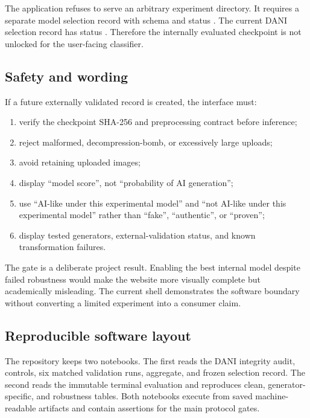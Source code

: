 \documentclass[12pt,a4paper]{article}
\begin{document}
The application refuses to serve an arbitrary experiment directory. It requires a separate model
selection record with schema  and status
. The current DANI selection record has status
. Therefore the internally evaluated
checkpoint is not unlocked for the user-facing classifier.

\subsection{Safety and wording}

If a future externally validated record is created, the interface must:

\begin{enumerate}
  \item verify the checkpoint SHA-256 and preprocessing contract before inference;
  \item reject malformed, decompression-bomb, or excessively large uploads;
  \item avoid retaining uploaded images;
  \item display ``model score'', not ``probability of AI generation'';
  \item use ``AI-like under this experimental model'' and ``not AI-like under this experimental
        model'' rather than ``fake'', ``authentic'', or ``proven'';
  \item display tested generators, external-validation status, and known transformation failures.
\end{enumerate}

The gate is a deliberate project result. Enabling the best internal model despite failed
robustness would make the website more visually complete but academically misleading. The current
shell demonstrates the software boundary without converting a limited experiment into a consumer
claim.

\subsection{Reproducible software layout}

The repository keeps two notebooks. The first reads the DANI integrity audit, controls, six matched
validation runs, aggregate, and frozen selection record. The second reads the immutable terminal
evaluation and reproduces clean, generator-specific, and robustness tables. Both notebooks execute
from saved machine-readable artifacts and contain assertions for the main protocol gates.
\end{document}
